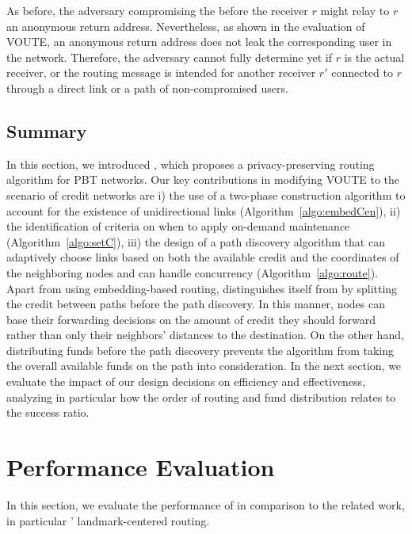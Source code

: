 As before, the adversary compromising the \user before the receiver $r$ might relay
to $r$  
an anonymous return address. Nevertheless, as shown in
the 
evaluation of VOUTE, 
an anonymous return address does not 
leak the corresponding user in the network. Therefore, 
the adversary cannot fully determine yet if 
$r$ is the actual receiver, or the routing message is intended for another receiver $r'$ connected 
to $r$ through a direct link or a path of non-compromised users.

 

\subsection{Summary}

In this section, we introduced \oursys , which proposes a privacy-preserving routing algorithm for PBT networks. Our key contributions in modifying VOUTE to the scenario of credit networks are i) the use of a two-phase construction algorithm to account for the existence of unidirectional links (Algorithm~\ref{algo:embedCen}), ii) the identification of criteria on when to apply on-demand maintenance (Algorithm~\ref{algo:setC}), iii) the design of a path discovery algorithm that can adaptively choose links based on both the available credit and the coordinates of the neighboring nodes and can handle concurrency (Algorithm~\ref{algo:route}).
Apart from using embedding-based routing, \oursys distinguishes itself from \cnsysname by splitting the credit between paths before the path discovery. In this manner, nodes can base their forwarding decisions on the amount of credit they should forward rather than only their neighbors' distances to the destination.  On the other hand, distributing funds before the path discovery prevents the algorithm from taking the overall available funds on the path into consideration. In the next section, we evaluate the impact of our design decisions on efficiency and effectiveness, analyzing in particular how the order of routing and fund distribution relates to the success ratio. 

\section{Performance Evaluation}
\label{sec:simu}

In this section, we evaluate the performance of \oursys in comparison to the related work, in particular \cnsysname ' landmark-centered routing.


